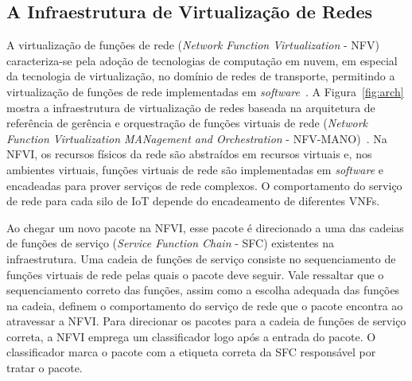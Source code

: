 \documentclass[12pt]{article}
\begin{document}
\subsection{A Infraestrutura de Virtualização de Redes}

A virtualização de funções de rede ({\it Network Function Virtualization} - NFV) caracteriza-se pela adoção de tecnologias de computação em nuvem, em especial da tecnologia de virtualização, no domínio de redes de transporte, permitindo a virtualização de funções de rede implementadas em {\it software}~\cite{survey-tarik}. A Figura~\ref{fig:arch} mostra a infraestrutura de virtualização de redes baseada na arquitetura de referência de gerência e orquestração de funções virtuais de rede ({\it Network Function Virtualization MANagement and Orchestration} - NFV-MANO)~\cite{etsi-nfv-mano}. Na NFVI, os recursos físicos da rede são abstraídos em recursos virtuais e, nos ambientes virtuais, funções virtuais de rede são implementadas em {\it software} e encadeadas para prover serviços de rede complexos. O comportamento do serviço de rede para cada silo de IoT depende do encadeamento de diferentes VNFs. 

Ao chegar um novo pacote na NFVI, esse pacote é direcionado a uma das cadeias de funções de serviço ({\it Service Function Chain} - SFC) existentes na infraestrutura. Uma cadeia de funções de serviço consiste no sequenciamento de funções virtuais de rede pelas quais o pacote deve seguir. Vale ressaltar que o sequenciamento correto das funções, assim como a escolha adequada das funções na cadeia, definem o comportamento do serviço de rede que o pacote encontra ao atravessar a NFVI. Para direcionar os pacotes para a cadeia de funções de serviço correta, a NFVI emprega um classificador logo após a entrada do pacote. O classificador marca o pacote com a etiqueta correta da SFC responsável por tratar o pacote. 

\end{document}
